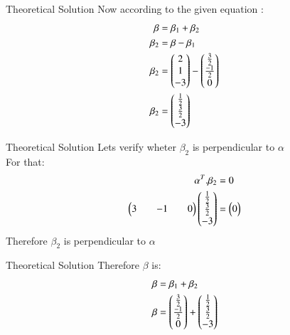 \documentclass{beamer}
\begin{document}
\begin{frame}{Theoretical Solution}
Now according to the given equation :
\begin{align}
    \beta&=\beta_1+\beta_2\\
    \beta_2&=\beta-\beta_1\\
    \beta_2&=\begin{pmatrix}2\\1\\-3\end{pmatrix}-\begin{pmatrix}\frac{3}{2}\\ \frac{-1}{2}\\0\end{pmatrix}\\
    \beta_2&=\begin{pmatrix}\frac{1}{2}\\ \frac{3}{2}\\-3\end{pmatrix}
\end{align}
\end{frame}
\begin{frame}{Theoretical Solution}
Lets verify wheter $\beta_2$ is perpendicular to $\alpha$\\
For that:
\begin{align}
    \alpha^T.\beta_2&=0\\
    \begin{pmatrix}3&&-1&&0\end{pmatrix}\begin{pmatrix}\frac{1}{2}\\ \frac{3}{2}\\-3\end{pmatrix}&=\begin{pmatrix}0\end{pmatrix}
\end{align}
Therefore $\beta_2$ is perpendicular to $\alpha$
\end{frame}
\begin{frame}{Theoretical Solution}
Therefore $\beta$ is:
\begin{align}
    \beta&=\beta_1+\beta_2\\
    \beta&=\begin{pmatrix}\frac{3}{2}\\ \frac{-1}{2}\\0\end{pmatrix}+\begin{pmatrix}\frac{1}{2}\\ \frac{3}{2}\\-3\end{pmatrix}
\end{align}
\end{frame}
\end{document}
